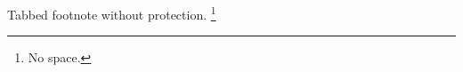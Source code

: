 \documentclass{article}
\begin{document}
Tabbed footnote without protection.
	\footnote{No space.}
\end{document}
